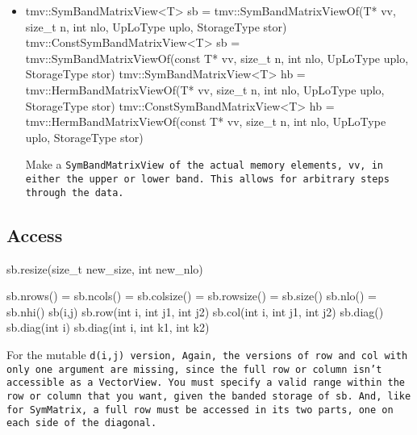 \begin{itemize}
\item
\begin{tmvcode}
tmv::SymBandMatrixView<T> sb = 
      tmv::SymBandMatrixViewOf(T* vv, size_t n, int nlo, 
          UpLoType uplo, StorageType stor)
tmv::ConstSymBandMatrixView<T> sb = 
      tmv::SymBandMatrixViewOf(const T* vv, size_t n, int nlo, 
          UpLoType uplo, StorageType stor)
tmv::SymBandMatrixView<T> hb = 
      tmv::HermBandMatrixViewOf(T* vv, size_t n, int nlo, 
          UpLoType uplo, StorageType stor)
tmv::ConstSymBandMatrixView<T> hb = 
      tmv::HermBandMatrixViewOf(const T* vv, size_t n, int nlo, 
          UpLoType uplo, StorageType stor)
\end{tmvcode}
Make a \tt{SymBandMatrixView} of the actual memory elements, \tt{vv}, in either the 
upper or lower band.  This allows for arbitrary steps through the data.

\end{itemize}

\subsection{Access}
\label{SymBandMatrix_Access}

\begin{tmvcode}
sb.resize(size_t new_size, int new_nlo)
\end{tmvcode}

\begin{tmvcode}
sb.nrows() = sb.ncols() = sb.colsize() = sb.rowsize() = sb.size()
sb.nlo() = sb.nhi()
sb(i,j)
sb.row(int i, int j1, int j2)
sb.col(int i, int j1, int j2)
sb.diag()
sb.diag(int i)
sb.diag(int i, int k1, int k2)
\end{tmvcode}
For the mutable \tt{d(i,j)} version, 
Again, the versions of \tt{row} and \tt{col} with only one argument are
missing, since the full row or column isn't accessible as a \tt{VectorView}.
You must specify a valid range within the row or column that you want, 
given the banded storage of \tt{sb}.  And, like for \tt{SymMatrix}, a full row
must be accessed in its two parts, one on each side of the diagonal.

